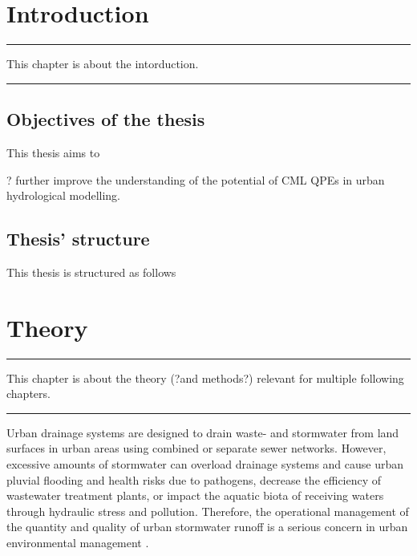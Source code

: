 \documentclass{ctuthesis}\usepackage[]{graphicx}\usepackage[]{color}
\begin{document}
        \maketitle
        


\chapter{Introduction} \label{chap1}

\rule{\textwidth}{0.4pt}
This chapter is about the intorduction. \newline
\rule[0.2cm]{\textwidth}{0.4pt}



\section{Objectives of the thesis}

This thesis aims to 

? further improve the understanding of the potential of CML QPEs in urban hydrological modelling.


\section{Thesis' structure}

This thesis is structured as follows

        


\chapter{Theory} \label{chap2}

\rule{\textwidth}{0.4pt}
This chapter is about the theory (?and methods?) relevant for multiple following chapters. \newline
\rule[0.2cm]{\textwidth}{0.4pt}


Urban drainage systems are designed to drain waste- and stormwater from land surfaces in urban areas using combined or separate sewer networks. However, excessive amounts of stormwater can overload drainage systems and cause urban pluvial flooding and health risks due to pathogens, decrease the efficiency of wastewater treatment plants, or impact the aquatic biota of receiving waters through hydraulic stress and pollution. Therefore, the operational management of the quantity and quality of urban stormwater runoff is a serious concern in urban environmental management \citep{tsihrintzisModelingManagementUrban1997}.
\end{document}
